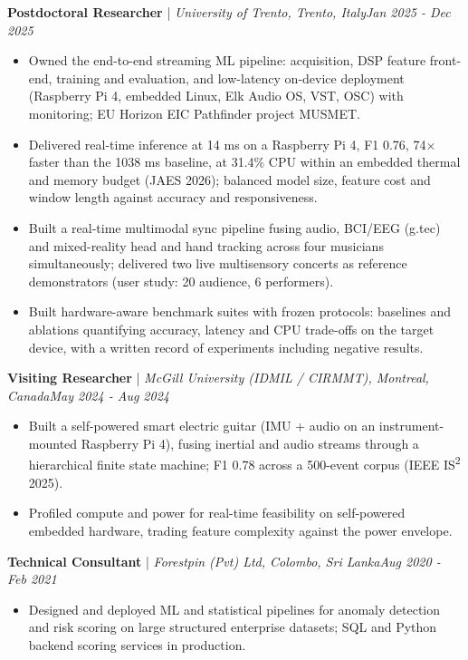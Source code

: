 \documentclass[11pt]{article}
\newenvironment{cvrole}[5]{%
  \par\noindent\textbf{\large #1} | \textit{\small #2, #3}\hfill \textit{\small #4 - #5}\par
  \begin{itemize}[leftmargin=2em, itemsep=-0.3em, topsep=-0.5em]%
}{%
  \end{itemize}\par\noindent\mbox{}\par\vspace{0.1em}%
}
\begin{document}
\begin{cvrole}{Postdoctoral Researcher}{University of Trento}{Trento, Italy}{Jan 2025}{Dec 2025}
    \item Owned the end-to-end streaming ML pipeline: acquisition, DSP feature front-end, training and evaluation, and low-latency on-device deployment (Raspberry Pi 4, embedded Linux, Elk Audio OS, VST, OSC) with monitoring; EU Horizon EIC Pathfinder project MUSMET.
    \item Delivered real-time inference at 14 ms on a Raspberry Pi 4, F1 0.76, 74$\times$ faster than the 1038 ms baseline, at 31.4\% CPU within an embedded thermal and memory budget (JAES 2026); balanced model size, feature cost and window length against accuracy and responsiveness.
    \item Built a real-time multimodal sync pipeline fusing audio, BCI/EEG (g.tec) and mixed-reality head and hand tracking across four musicians simultaneously; delivered two live multisensory concerts as reference demonstrators (user study: 20 audience, 6 performers).
    \item Built hardware-aware benchmark suites with frozen protocols: baselines and ablations quantifying accuracy, latency and CPU trade-offs on the target device, with a written record of experiments including negative results.
\end{cvrole}

\begin{cvrole}{Visiting Researcher}{McGill University (IDMIL / CIRMMT)}{Montreal, Canada}{May 2024}{Aug 2024}
    \item Built a self-powered smart electric guitar (IMU + audio on an instrument-mounted Raspberry Pi 4), fusing inertial and audio streams through a hierarchical finite state machine; F1 0.78 across a 500-event corpus (IEEE IS\textsuperscript{2} 2025).
    \item Profiled compute and power for real-time feasibility on self-powered embedded hardware, trading feature complexity against the power envelope.
\end{cvrole}

\begin{cvrole}{Technical Consultant}{Forestpin (Pvt) Ltd}{Colombo, Sri Lanka}{Aug 2020}{Feb 2021}
    \item Designed and deployed ML and statistical pipelines for anomaly detection and risk scoring on large structured enterprise datasets; SQL and Python backend scoring services in production.
\end{cvrole}
\end{document}
